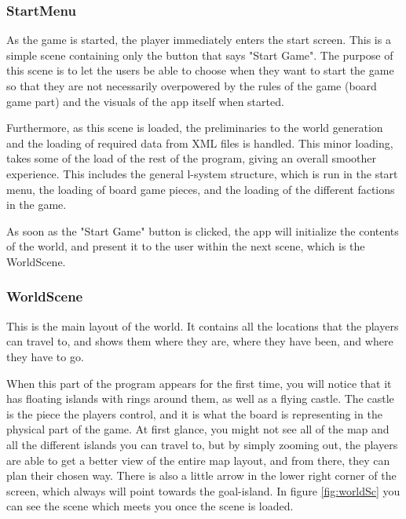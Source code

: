 \subsubsection{StartMenu}
As the game is started, the player immediately enters the start screen. This is a simple scene containing only the button that says "Start Game". The purpose of this scene is to let the users be able to choose when they want to start the game so that they are not necessarily overpowered by the rules of the game (board game part) and the visuals of the app itself when started.

Furthermore, as this scene is loaded, the preliminaries to the world generation and the loading of required data from XML files is handled. This minor loading, takes some of the load of the rest of the program, giving an overall smoother experience.
This includes the general l-system structure, which is run in the start menu, the loading of board game pieces, and the loading of the different factions in the game.

As soon as the "Start Game" button is clicked, the app will initialize the contents of the world, and present it to the user within the next scene, which is the WorldScene.

\subsubsection{WorldScene}
\label{sec:worldscene}
This is the main layout of the world. It contains all the locations that the players can travel to, and shows them where they are, where they have been, and where they have to go.

When this part of the program appears for the first time, you will notice that it has floating islands with rings around them, as well as a flying castle. The castle is the piece the players control, and it is what the board is representing in the physical part of the game.
At first glance, you might not see all of the map and all the different islands you can travel to, but by simply zooming out, the players are able to get a better view of the entire map layout, and from there, they can plan their chosen way. There is also a little arrow in the lower right corner of the screen, which always will point towards the goal-island. 
In figure \ref{fig:worldSc} you can see the scene which meets you once the scene is loaded.

